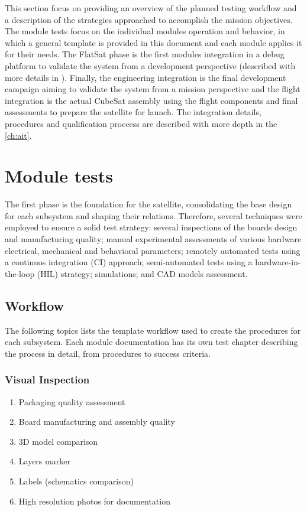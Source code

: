 This section focus on providing an overview of the planned testing workflow and a description of the strategies approached to accomplish the mission objectives. The module tests focus on the individual modules operation and behavior, in which a general template is provided in this document and each module applies it for their needs. The FlatSat phase is the first modules integration in a debug platform to validate the system from a development perspective (described with more details in \cite{flatsat}). Finally, the engineering integration is the final development campaign aiming to validate the system from a mission perspective and the flight integration is the actual CubeSat assembly using the flight components and final assessments to prepare the satellite for launch. The integration details, procedures and qualification proccess are described with more depth in the \autoref{ch:ait}. %


\section{Module tests}

The first phase is the foundation for the satellite, consolidating the base design for each subsystem and shaping their relations. Therefore, several techniques were employed to ensure a solid test strategy: several inspections of the boards design and manufacturing quality; manual experimental assessments of various hardware electrical, mechanical and behavioral parameters; remotely automated tests using a continuos integration (CI) approach; semi-automated tests using a hardware-in-the-loop (HIL) strategy; simulations; and CAD models assessment.

\subsection{Workflow}

The following topics lists the template workflow used to create the procedures for each subsystem. Each module documentation has its own test chapter describing the process in detail, from procedures to success criteria.

\subsubsection{Visual Inspection} 
\begin{enumerate} \setlength\itemsep{-0.3em}
    \item Packaging quality assessment
    \item Board manufacturing and assembly quality
    \item 3D model comparison
    \item Layers marker
    \item Labels (schematics comparison) 
    \item High resolution photos for documentation
\end{enumerate}

